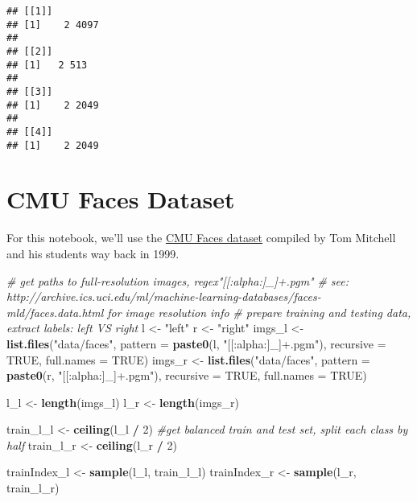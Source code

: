 \documentclass[]{book}
\newenvironment{Shaded}{\begin{snugshade}}{\end{snugshade}}
\newcommand{\KeywordTok}[1]{\textcolor[rgb]{0.13,0.29,0.53}{\textbf{#1}}}
\newcommand{\DataTypeTok}[1]{\textcolor[rgb]{0.13,0.29,0.53}{#1}}
\newcommand{\DecValTok}[1]{\textcolor[rgb]{0.00,0.00,0.81}{#1}}
\newcommand{\StringTok}[1]{\textcolor[rgb]{0.31,0.60,0.02}{#1}}
\newcommand{\CommentTok}[1]{\textcolor[rgb]{0.56,0.35,0.01}{\textit{#1}}}
\newcommand{\OtherTok}[1]{\textcolor[rgb]{0.56,0.35,0.01}{#1}}
\newcommand{\OperatorTok}[1]{\textcolor[rgb]{0.81,0.36,0.00}{\textbf{#1}}}
\newcommand{\NormalTok}[1]{#1}
\theoremstyle{definition}
\theoremstyle{definition}
\theoremstyle{definition}
\theoremstyle{remark}
\begin{document}
\begin{verbatim}
## [[1]]
## [1]    2 4097
## 
## [[2]]
## [1]   2 513
## 
## [[3]]
## [1]    2 2049
## 
## [[4]]
## [1]    2 2049
\end{verbatim}

\section{CMU Faces Dataset}\label{cmu-faces-dataset}

For this notebook, we'll use the
\href{http://archive.ics.uci.edu/ml/datasets/CMU+Face+Images}{CMU Faces
dataset} compiled by Tom Mitchell and his students way back in 1999.

\begin{Shaded}
\begin{Highlighting}[]
\CommentTok{# get paths to full-resolution images, regex"[[:alpha:]_]+.pgm"}
\CommentTok{# see: http://archive.ics.uci.edu/ml/machine-learning-databases/faces-mld/faces.data.html for image resolution info}
\CommentTok{# prepare training and testing data, extract labels: left VS right}
\NormalTok{l <-}\StringTok{ "left"}
\NormalTok{r <-}\StringTok{ "right"}
\NormalTok{imgs_l <-}\StringTok{ }\KeywordTok{list.files}\NormalTok{(}\StringTok{"data/faces"}\NormalTok{,}
                     \DataTypeTok{pattern =} \KeywordTok{paste0}\NormalTok{(l, }\StringTok{"[[:alpha:]_]+.pgm"}\NormalTok{),}
                     \DataTypeTok{recursive =} \OtherTok{TRUE}\NormalTok{, }\DataTypeTok{full.names =} \OtherTok{TRUE}\NormalTok{)}
\NormalTok{imgs_r <-}\StringTok{ }\KeywordTok{list.files}\NormalTok{(}\StringTok{"data/faces"}\NormalTok{,}
                     \DataTypeTok{pattern =} \KeywordTok{paste0}\NormalTok{(r, }\StringTok{"[[:alpha:]_]+.pgm"}\NormalTok{), }
                     \DataTypeTok{recursive =} \OtherTok{TRUE}\NormalTok{, }\DataTypeTok{full.names =} \OtherTok{TRUE}\NormalTok{)}

\NormalTok{l_l <-}\StringTok{ }\KeywordTok{length}\NormalTok{(imgs_l)}
\NormalTok{l_r <-}\StringTok{ }\KeywordTok{length}\NormalTok{(imgs_r)}

\NormalTok{train_l_l <-}\StringTok{ }\KeywordTok{ceiling}\NormalTok{(l_l }\OperatorTok{/}\StringTok{ }\DecValTok{2}\NormalTok{) }\CommentTok{#get balanced train and test set, split each class by half}
\NormalTok{train_l_r <-}\StringTok{ }\KeywordTok{ceiling}\NormalTok{(l_r }\OperatorTok{/}\StringTok{ }\DecValTok{2}\NormalTok{)}

\NormalTok{trainIndex_l <-}\StringTok{ }\KeywordTok{sample}\NormalTok{(l_l, train_l_l)}
\NormalTok{trainIndex_r <-}\StringTok{ }\KeywordTok{sample}\NormalTok{(l_r, train_l_r)}


\end{Highlighting}
\end{Shaded}
\end{document}
